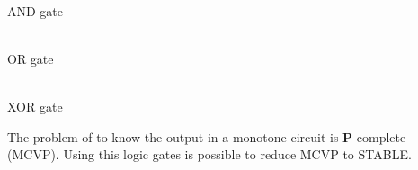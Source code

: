 \documentclass[lanscape,a0paper,fontscale=0.277]{baposter}
\begin{document}
\begin{poster}
{\begin{center}
  \begin{minipage}[t]{0.325\textwidth}
      \begin{center}
      \begin{tikzpicture}[scale=0.075]
      \end{tikzpicture}\\
      AND gate
      \end{center}
  \end{minipage}    
  \begin{minipage}[t]{0.325\textwidth}
      \begin{center}
      \begin{tikzpicture}[scale=0.075]
      \end{tikzpicture}\\
      OR gate
      \end{center}
  \end{minipage}    
  \begin{minipage}[t]{0.325\textwidth}
      \begin{center}
      \begin{tikzpicture}[scale=0.075]
      \end{tikzpicture}\\
      XOR gate
      \end{center}
  \end{minipage}    
\end{center}
The problem of to know the output in a monotone circuit is {{\bf P}}-complete (MCVP). 
Using this logic gates is possible to reduce MCVP to STABLE.
 }  

\end{poster}
\end{document}
